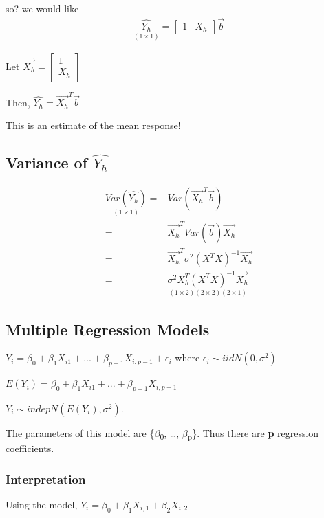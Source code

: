 \documentclass[11pt]{article}
\begin{document}
so? we would like
\begin{equation}
\begin{split}
\underset{(1 \times 1)}{\hat{Y_h}} = \begin{bmatrix}
1 & X_h
\end{bmatrix}
\vec{b}
\end{split}
\end{equation}


Let \(\vec{X_h} = \begin{bmatrix}
1\\
X_h
\end{bmatrix}\)

Then, \(\hat{Y_h} = \vec{X_h}^T \vec{b}\)

This is an estimate of the mean response!
\subsection{Variance of \(\hat{Y_h}\)}
\label{sec:orgd039583}
\begin{equation}
  \begin{split}
    \underset{(1 \times 1)}{Var(\hat{Y_h})} = & Var(\vec{X_h}^T \vec{b})\\
                                            = & \vec{X_h}^T Var(\vec{b}) \vec{X_h}\\
                                            = & \vec{X_h}^T \sigma^2(X^T X)^{-1} \vec{X_h}\\
                                            = & \underset{(1 \times 2)(2 \times 2)(2 \times 1)}{\sigma^2 X_h^T (X^T X)^{-1} \vec{X_h}}
  \end{split}
\end{equation}
\subsection{Multiple Regression Models}
\label{sec:orgb9067c5}

\(Y_i = \beta_0 + \beta_1 X_{i1} + ... + \beta_{p - 1} X_{i, p - 1} + \epsilon_i\)
where \(\epsilon_i \sim iid N(0, \sigma^2)\)

\(E(Y_i) = \beta_0 + \beta_1 X_{i1} + ... + \beta_{p - 1} X_{i, p - 1}\)

\(Y_i \sim indep N(E(Y_i), \sigma^2)\).

The parameters of this model are \{\(\beta\)\textsubscript{0}, \ldots{}, \(\beta\)\textsubscript{p}\}. Thus there are \textbf{p}
regression coefficients.

\subsubsection{Interpretation}
\label{sec:org6b9cbc3}
Using the model, \(Y_i = \beta_0 + \beta_1 X_{i,1} + \beta_2 X_{i,2}\)
\end{document}
